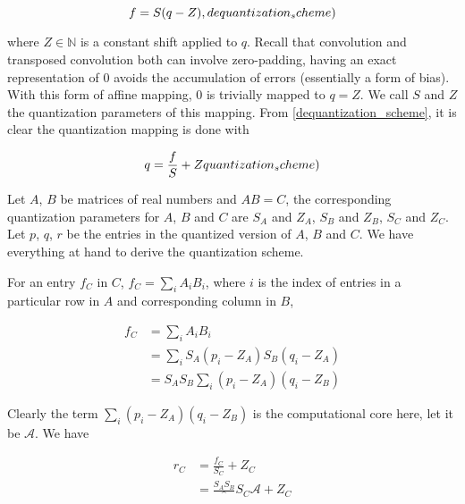 \begin{equation}
  f = S(q - Z),
  \label(dequantization_scheme)
\end{equation}

where $Z \in \mathbb{N}$ is a constant shift applied to $q$. Recall that convolution and transposed convolution
both can involve zero-padding, having an exact representation of $0$ avoids the accumulation of errors
(essentially a form of bias). With this form of affine mapping, $0$ is trivially mapped to $q = Z$. We call
$S$ and $Z$ the quantization parameters of this mapping. From \ref{dequantization_scheme}, it is clear the
quantization mapping is done with

\begin{equation}
  q = \frac{f}{S} + Z
  \label(quantization_scheme)
\end{equation}

Let $A$, $B$ be matrices of real numbers and $A B = C$, the corresponding quantization parameters for $A$,
$B$ and $C$ are $S_A$ and $Z_A$, $S_B$ and $Z_B$, $S_C$ and $Z_C$. Let $p$, $q$, $r$ be the entries in the
quantized version of $A$, $B$ and $C$. We have everything at hand to derive the quantization scheme.

For an entry $f_C$ in $C$, $f_C = \sum_{i}^{} A_i B_i$, where $i$ is the index of entries in a particular
row in $A$ and corresponding column in $B$,

\begin{equation}
\begin{split}
  f_C & = \sum_{i}^{} A_i B_i \\
      & = \sum_{i}^{} S_A (p_i - Z_A) S_B (q_i - Z_A) \\
      & = S_A S_B \sum_{i}^{} (p_i - Z_A) (q_i - Z_B)
\end{split}
\end{equation}

Clearly the term $\sum_{i}^{} (p_i - Z_A) (q_i - Z_B)$ is the computational core here, let it be
$\mathscr{A}$. We have

\begin{equation}
\begin{split}
  r_C & = \frac{f_C}{S_C} + Z_C \\
      & = \frac{S_A S_B}^{S_C} \mathscr{A} + Z_C
\end{split}
\end{equation}

\clearpage %
